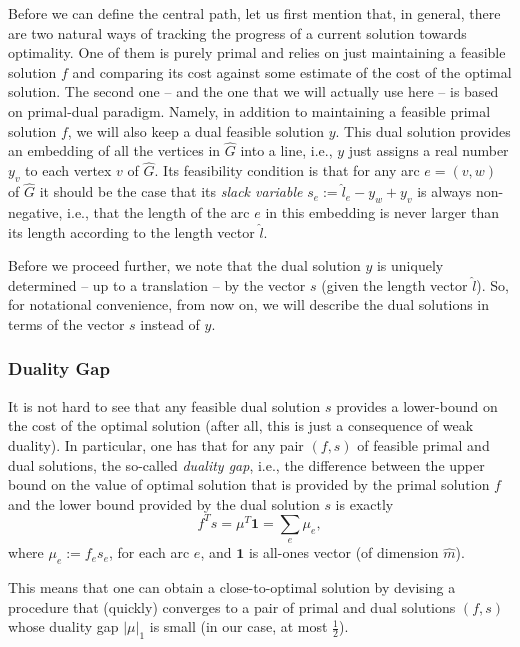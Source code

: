 \documentclass[11pt, letterpaper]{article}
\newcommand{\onev}{\mathbf{1}}
\newcommand{\onorm}[1]{|#1|_{1}}
\newcommand{\hG}{\widehat{G}}
\newcommand{\hm}{\widehat{m}}
\newcommand{\hl}{\hat{l}}
\newcommand{\vmu}{\boldsymbol{\mathit{\mu}}}
\newcommand{\ff}{\boldsymbol{\mathit{f}}}
\newcommand{\hll}{\boldsymbol{\mathit{\hat{l}}}}
\renewcommand{\ss}{\boldsymbol{\mathit{s}}}
\newcommand{\yy}{\boldsymbol{\mathit{y}}}
\begin{document}
Before we can define the central path, let us first mention that, in general, there are two natural ways of tracking the progress of a current solution towards optimality. One of them is purely primal and relies on just maintaining a feasible solution $\ff$ and comparing its cost against some estimate of the cost of the optimal solution. The second one -- and the one that we will actually use here -- is based on primal-dual paradigm. Namely, in addition to maintaining a feasible primal solution $\ff$, we will also keep a dual feasible solution $\yy$. This dual solution provides an embedding of all the vertices in $\hG$ into a line, i.e., $\yy$ just assigns a real number $y_v$ to each vertex $v$ of $\hG$. Its feasibility condition is that for any arc $e=(v,w)$ of $\hG$ it should be the case that its {\em slack variable} $s_e:=\hl_e-y_w+y_v$ is always non-negative, i.e., that the length of the arc $e$ in this embedding is never larger than its length according to the length vector $\hll$. 

Before we proceed further, we note that the dual solution $\yy$ is uniquely determined -- up to a translation -- by the vector $\ss$ (given the length vector $\hll$). So, for notational convenience, from now on, we will describe the dual solutions in terms of the vector $\ss$ instead of $\yy$.

\subsubsection*{Duality Gap}

It is not hard to see that any feasible dual solution $\ss$ provides a lower-bound on the cost of the optimal solution (after all, this is just a consequence of weak duality). In particular, one has that for any pair $(\ff,\ss)$ of feasible primal and dual solutions, the so-called {\em duality gap}, i.e., the difference between the upper bound on the value of optimal solution that is provided by the primal solution $\ff$ and the lower bound provided by the dual solution $\ss$ is exactly 
\[
\ff^T \ss = \vmu^T \onev = \sum_{e} \mu_e,
\]
where $\mu_e:=f_es_e$, for each arc $e$, and $\onev$ is all-ones vector (of dimension $\hm$). 

This means that one can obtain a close-to-optimal solution by devising a procedure that (quickly) converges to a pair of primal and dual solutions $(\ff,\ss)$ whose duality gap $\onorm{\vmu}$ is small (in our case, at most $\frac{1}{2}$). 
\end{document}
